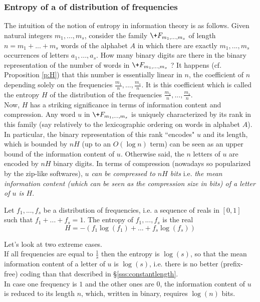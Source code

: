 \subsubsection{Entropy of a of distribution of frequencies}
\label{sss:entropy}
The intuition of the notion of entropy in information theory
is as follows.
Given natural integers $m_1,...,m_s$, consider the family
$\+F_{m_1,...,m_s}$ of length $n=m_1+...+m_s$ words
of the alphabet $A$ in which there are exactly $m_1,...,m_s$
occurrences of letters $a_1,...,a_s$.
How many binary digits are there in the binary representation
of the number of words in $\+F_{m_1,...,m_s}$ ?
It happens (cf. Proposition \ref{p:H})
that this number is essentially linear in
$n$, the coefficient of $n$ depending solely on the frequencies
$\frac{m_1}{n},...,\frac{m_s}{n}$.
It is this coefficient which is called the entropy $H$ of the
distribution of the frequencies $\frac{m_1}{n},...,\frac{m_s}{n}$.
\\
Now, $H$ has a striking significance in terms of information
content and compression.
Any word $u$ in $\+F_{m_1,...,m_s}$ is uniquely
characterized by its rank in this family
(say relatively to the lexicographic ordering on words
in alphabet $A$).
In particular, the binary representation of this rank ``encodes"
$u$ and its length, which is bounded by $nH$
(up to an $O(\log n)$ term) can be seen as an upper bound
of the information content of $u$.
Otherwise said, the $n$ letters of $u$ are encoded by $nH$
binary digits.
In terms of compression
(nowadays so popularized by the zip-like softwares),
{\em $u$ can be compressed to $nH$ bits}
i.e.
{\em the mean information content
(which can be seen as the compression size in bits)
of a letter of $u$ is $H$}.
\begin{definition} 
Let $f_1,...,f_s$ be a distribution of frequencies,
i.e. a sequence of reals in $[0,1]$ such that $f_1+...+f_s=1$.
The entropy of $f_1,...,f_s$ is the real
$$
H = -(f_1\log(f_1) +...+f_s\log(f_s))
$$
\end{definition}
Let's look at two extreme cases.
\\
If all frequencies are equal to $\frac{1}{s}$
then the entropy is $\log(s)$, so that the mean information content
of a letter of $u$ is $\log(s)$,
i.e. there is no better  (prefix-free) coding than that described in
\S\ref{sss:constantlength}.
\\
In case one frequency is $1$ and the other ones are $0$,
the information content of $u$ is reduced to its length $n$,
which, written in binary, requires $\log(n)$ bits.
